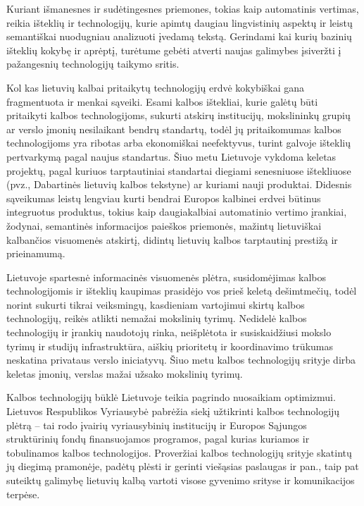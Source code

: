 \begin{multicols}{2}
Kuriant išmanesnes ir sudėtingesnes priemones, tokias kaip automatinis vertimas, reikia išteklių ir technologijų, kurie apimtų daugiau lingvistinių aspektų ir leistų semantiškai  nuodugniau analizuoti įvedamą tekstą. Gerindami kai kurių bazinių išteklių kokybę ir aprėptį, turėtume gebėti atverti naujas galimybes įsiveržti į pažangesnių technologijų taikymo sritis.

Kol kas lietuvių kalbai pritaikytų technologijų erdvė kokybiškai gana fragmentuota ir menkai sąveiki. Esami kalbos ištekliai, kurie galėtų būti pritaikyti kalbos technologijoms, sukurti atskirų institucijų, mokslininkų grupių ar verslo įmonių nesilaikant bendrų standartų, todėl jų pritaikomumas kalbos technologijoms yra ribotas arba ekonomiškai neefektyvus, turint galvoje išteklių pertvarkymą pagal naujus standartus. 
Šiuo metu Lietuvoje vykdoma keletas projektų, pagal kuriuos tarptautiniai standartai diegiami senesniuose ištekliuose (pvz., Dabartinės lietuvių kalbos tekstyne) ar kuriami nauji produktai. Didesnis sąveikumas leistų lengviau kurti bendrai Europos kalbinei erdvei būtinus integruotus produktus, tokius kaip daugiakalbiai automatinio vertimo įrankiai, žodynai, semantinės informacijos paieškos priemonės, mažintų lietuviškai kalbančios visuomenės atskirtį, didintų lietuvių kalbos tarptautinį prestižą ir prieinamumą.

Lietuvoje spartesnė informacinės visuomenės plėtra, susidomėjimas kalbos technologijomis ir išteklių kaupimas prasidėjo vos prieš keletą dešimtmečių, todėl norint sukurti tikrai veiksmingų, kasdieniam vartojimui skirtų kalbos technologijų, reikės atlikti nemažai mokslinių tyrimų. Nedidelė kalbos technologijų ir įrankių naudotojų rinka, neišplėtota ir susiskaidžiusi mokslo tyrimų ir studijų infrastruktūra, aiškių prioritetų ir koordinavimo trūkumas neskatina privataus verslo iniciatyvų. Šiuo metu kalbos technologijų srityje dirba keletas įmonių, verslas mažai užsako mokslinių tyrimų. 

Kalbos technologijų būklė Lietuvoje teikia pagrindo nuosaikiam optimizmui. Lietuvos Respublikos Vyriausybė pabrėžia siekį užtikrinti kalbos technologijų plėtrą – tai rodo įvairių vyriausybinių institucijų ir Europos Sąjungos struktūrinių fondų finansuojamos programos, pagal kurias kuriamos ir tobulinamos kalbos technologijos. Proveržiai kalbos technologijų srityje skatintų jų diegimą pramonėje, padėtų plėsti ir gerinti viešąsias paslaugas ir pan., taip pat suteiktų galimybę lietuvių kalbą vartoti visose gyvenimo srityse ir komunikacijos terpėse.


\end{multicols}
